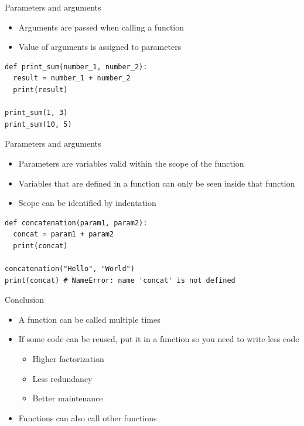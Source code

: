 \documentclass[10pt, a4paper]{beamer} %
\begin{document}
\begin{frame}
\framebreak
\begin{block}{Parameters and arguments}
  \begin{itemize}
    \item Arguments are passed when calling a function
    \item Value of arguments is assigned to parameters
  \end{itemize}
  \begin{lstlisting}
def print_sum(number_1, number_2):
  result = number_1 + number_2
  print(result)

print_sum(1, 3)
print_sum(10, 5)
  \end{lstlisting}
\end{block}
\begin{block}{Parameters and arguments}
  \framebreak
  \begin{itemize}
    \item Parameters are variables valid within the scope of the function
    \item Variables that are defined in a function can only be seen inside that function
    \item Scope can be identified by indentation
  \end{itemize}
  \begin{lstlisting}
def concatenation(param1, param2):
  concat = param1 + param2
  print(concat)

concatenation("Hello", "World")
print(concat) # NameError: name 'concat' is not defined
  \end{lstlisting}
\end{block}
\begin{block}{Conclusion}
  \begin{itemize}
    \item A function can be called multiple times
    \item If some code can be reused, put it in a function so you need to write less code
    \begin{itemize}
      \item Higher factorization
      \item Less redundancy
      \item Better maintenance
    \end{itemize}
    \item Functions can also call other functions
  \end{itemize}
\end{block}
\end{frame}
\end{document}
